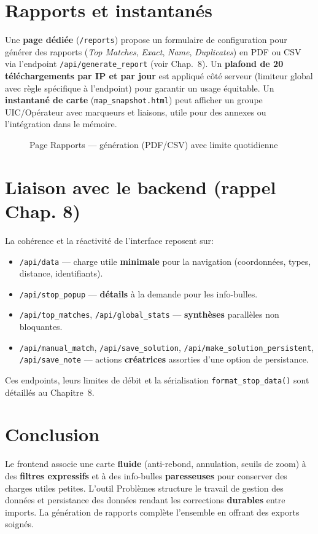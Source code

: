 \section{Rapports et instantanés}
\label{subsec:rapports}

Une \textbf{page dédiée} (\texttt{/reports}) propose un formulaire de configuration pour générer des rapports (\textit{Top Matches}, \textit{Exact}, \textit{Name}, \textit{Duplicates}) en PDF ou CSV via l'endpoint \texttt{/api/generate\_report} (voir Chap.~8). Un \textbf{plafond de 20 téléchargements par IP et par jour} est appliqué côté serveur (limiteur global avec règle spécifique à l'endpoint) pour garantir un usage équitable. Un \textbf{instantané de carte} (\texttt{map\_snapshot.html}) peut afficher un groupe UIC/Opérateur avec marqueurs et liaisons, utile pour des annexes ou l'intégration dans le mémoire.

\begin{figure}[h]
  \centering
  \caption{Page Rapports — génération (PDF/CSV) avec limite quotidienne}
  \label{fig:frontend-report}
\end{figure}

\section{Liaison avec le backend (rappel Chap. 8)}

La cohérence et la réactivité de l'interface reposent sur:
\begin{itemize}
  \item \texttt{/api/data} — charge utile \textbf{minimale} pour la navigation (coordonnées, types, distance, identifiants).
  \item \texttt{/api/stop\_popup} — \textbf{détails} à la demande pour les info-bulles.
  \item \texttt{/api/top\_matches}, \texttt{/api/global\_stats} — \textbf{synthèses} parallèles non bloquantes.
  \item \texttt{/api/manual\_match}, \texttt{/api/save\_solution}, \texttt{/api/make\_solution\_persistent}, \texttt{/api/save\_note} — actions \textbf{créatrices} assorties d'une option de persistance.
\end{itemize}

Ces endpoints, leurs limites de débit et la sérialisation \texttt{format\_stop\_data()} sont détaillés au Chapitre~8.

\section*{Conclusion}

Le frontend associe une carte \textbf{fluide} (anti-rebond, annulation, seuils de zoom) à des \textbf{filtres expressifs} et à des info-bulles \textbf{paresseuses} pour conserver des charges utiles petites. L'outil Problèmes structure le travail de gestion des données et  persistance des données rendant les corrections \textbf{durables} entre imports. La génération de rapports complète l'ensemble en offrant des exports soignés.
